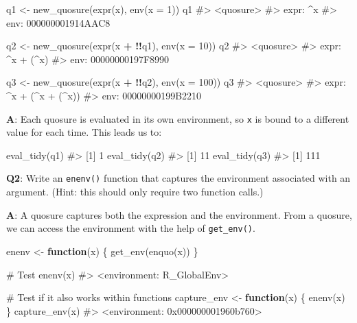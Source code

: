 \documentclass[
]{krantz}
\makeatletter
\newenvironment{Shaded}{\begin{snugshade}}{\end{snugshade}}
\newcommand{\CommentTok}[1]{\textcolor[rgb]{0.56,0.35,0.01}{\textit{#1}}}
\newcommand{\ControlFlowTok}[1]{\textcolor[rgb]{0.13,0.29,0.53}{\textbf{#1}}}
\newcommand{\DataTypeTok}[1]{\textcolor[rgb]{0.13,0.29,0.53}{#1}}
\newcommand{\DecValTok}[1]{\textcolor[rgb]{0.00,0.00,0.81}{#1}}
\newcommand{\KeywordTok}[1]{\textcolor[rgb]{0.13,0.29,0.53}{\textbf{#1}}}
\newcommand{\NormalTok}[1]{#1}
\newcommand{\OperatorTok}[1]{\textcolor[rgb]{0.81,0.36,0.00}{\textbf{#1}}}
\newcommand{\StringTok}[1]{\textcolor[rgb]{0.31,0.60,0.02}{#1}}
\newenvironment{kframe}{%
\medskip{}
\setlength{\fboxsep}{.8em}
 \def\at@end@of@kframe{}%
 \ifinner\ifhmode%
  \def\at@end@of@kframe{\end{minipage}}%
  \begin{minipage}{\columnwidth}%
 \fi\fi%
 \def\FrameCommand##1{\hskip\@totalleftmargin \hskip-\fboxsep
 \colorbox{shadecolor}{##1}\hskip-\fboxsep
     \hskip-\linewidth \hskip-\@totalleftmargin \hskip\columnwidth}%
 \MakeFramed {\advance\hsize-\width
   \@totalleftmargin\z@ \linewidth\hsize
   \@setminipage}}%
 {\par\unskip\endMakeFramed%
 \at@end@of@kframe}
\renewenvironment{Shaded}{\begin{kframe}}{\end{kframe}}
\renewcommand{\KeywordTok} [1]{\textcolor[rgb]{0.00,0.44,0.13}{{#1}}}
\renewcommand{\DataTypeTok}[1]{\textcolor[rgb]{0.56,0.13,0.00}{{#1}}}
\renewcommand{\DecValTok}  [1]{\textcolor[rgb]{0.25,0.63,0.44}{{#1}}}
\renewcommand{\StringTok}  [1]{\textcolor[rgb]{0.25,0.44,0.63}{{#1}}}
\renewcommand{\CommentTok} [1]{\textcolor[rgb]{0.38,0.63,0.69}{{#1}}}
\renewcommand{\NormalTok}  [1]{{#1}}
\makeatother
\begin{document}
\begin{Shaded}
\begin{Highlighting}[]
\NormalTok{q1 <-}\StringTok{ }\KeywordTok{new_quosure}\NormalTok{(}\KeywordTok{expr}\NormalTok{(x), }\KeywordTok{env}\NormalTok{(}\DataTypeTok{x =} \DecValTok{1}\NormalTok{))}
\NormalTok{q1}
\CommentTok{#> <quosure>}
\CommentTok{#> expr: ^x}
\CommentTok{#> env:  000000001914AAC8}

\NormalTok{q2 <-}\StringTok{ }\KeywordTok{new_quosure}\NormalTok{(}\KeywordTok{expr}\NormalTok{(x }\OperatorTok{+}\StringTok{ }\OperatorTok{!!}\NormalTok{q1), }\KeywordTok{env}\NormalTok{(}\DataTypeTok{x =} \DecValTok{10}\NormalTok{))}
\NormalTok{q2}
\CommentTok{#> <quosure>}
\CommentTok{#> expr: ^x + (^x)}
\CommentTok{#> env:  00000000197F8990}

\NormalTok{q3 <-}\StringTok{ }\KeywordTok{new_quosure}\NormalTok{(}\KeywordTok{expr}\NormalTok{(x }\OperatorTok{+}\StringTok{ }\OperatorTok{!!}\NormalTok{q2), }\KeywordTok{env}\NormalTok{(}\DataTypeTok{x =} \DecValTok{100}\NormalTok{))}
\NormalTok{q3}
\CommentTok{#> <quosure>}
\CommentTok{#> expr: ^x + (^x + (^x))}
\CommentTok{#> env:  00000000199B2210}
\end{Highlighting}
\end{Shaded}

\textbf{{A}}: Each quosure is evaluated in its own environment, so \texttt{x} is bound to a different value for each time. This leads us to:

\begin{Shaded}
\begin{Highlighting}[]
\KeywordTok{eval_tidy}\NormalTok{(q1)}
\CommentTok{#> [1] 1}
\KeywordTok{eval_tidy}\NormalTok{(q2)}
\CommentTok{#> [1] 11}
\KeywordTok{eval_tidy}\NormalTok{(q3)}
\CommentTok{#> [1] 111}
\end{Highlighting}
\end{Shaded}

\textbf{{Q2}}: Write an \texttt{enenv()} function that captures the environment associated with an argument. (Hint: this should only require two function calls.)

\textbf{{A}}: A quosure captures both the expression and the environment. From a quosure, we can access the environment with the help of \texttt{get\_env()}.

\begin{Shaded}
\begin{Highlighting}[]
\NormalTok{enenv <-}\StringTok{ }\ControlFlowTok{function}\NormalTok{(x) \{}
  \KeywordTok{get_env}\NormalTok{(}\KeywordTok{enquo}\NormalTok{(x))}
\NormalTok{\}}

\CommentTok{# Test}
\KeywordTok{enenv}\NormalTok{(x)}
\CommentTok{#> <environment: R_GlobalEnv>}

\CommentTok{# Test if it also works within functions}
\NormalTok{capture_env <-}\StringTok{ }\ControlFlowTok{function}\NormalTok{(x) \{}
  \KeywordTok{enenv}\NormalTok{(x)}
\NormalTok{\}}
\KeywordTok{capture_env}\NormalTok{(x)}
\CommentTok{#> <environment: 0x000000001960b760>}
\end{Highlighting}
\end{Shaded}
\end{document}

